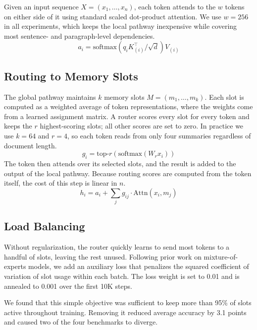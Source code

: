 \documentclass[conference,letterpaper]{IEEEtran}
\begin{document}
Given an input sequence $X = (x_1, \ldots, x_n)$, each token attends to the $w$ tokens on either side of it using standard scaled dot-product attention. We use $w = 256$ in all experiments, which keeps the local pathway inexpensive while covering most sentence- and paragraph-level dependencies.
\begin{equation}
a_i = \mathrm{softmax}\!\left(q_i K_{(i)}^{\top} / \sqrt{d}\right) V_{(i)}
\end{equation}

\subsection{Routing to Memory Slots}

The global pathway maintains $k$ memory slots $M = (m_1, \ldots, m_k)$. Each slot is computed as a weighted average of token representations, where the weights come from a learned assignment matrix. A router scores every slot for every token and keeps the $r$ highest-scoring slots; all other scores are set to zero. In practice we use $k = 64$ and $r = 4$, so each token reads from only four summaries regardless of document length.
\begin{equation}
g_i = \mathrm{top}\text{-}r\left(\mathrm{softmax}(W_r x_i)\right)
\end{equation}
The token then attends over its selected slots, and the result is added to the output of the local pathway. Because routing scores are computed from the token itself, the cost of this step is linear in $n$.
\begin{equation}
h_i = a_i + \textstyle\sum_j g_{ij} \cdot \mathrm{Attn}(x_i, m_j)
\end{equation}

\subsection{Load Balancing}

Without regularization, the router quickly learns to send most tokens to a handful of slots, leaving the rest unused. Following prior work on mixture-of-experts models, we add an auxiliary loss that penalizes the squared coefficient of variation of slot usage within each batch. The loss weight is set to 0.01 and is annealed to 0.001 over the first 10K steps.

We found that this simple objective was sufficient to keep more than 95\% of slots active throughout training. Removing it reduced average accuracy by 3.1 points and caused two of the four benchmarks to diverge.
\end{document}
